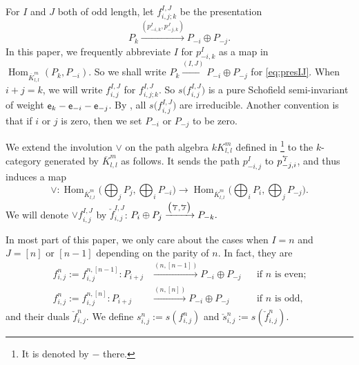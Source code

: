 \documentclass{amsart}
\theoremstyle{definition}
\theoremstyle{remark}
\numberwithin{equation}{section}
\DeclareMathOperator{\Hom}{Hom}
\newcommand{\br}[1]{\overline{#1}}
\newcommand{\e}{{\sf e}}
\newcommand{\kllm}{{K_{l,l}^m}}
\newcommand{\invarr}[1]{{\scriptsize \overleftarrow{#1}}}
\newcommand{\ijn}{_{i,j}^{n}}
\begin{document}
For $I$ and $J$ both of odd length, let $f_{i,j;k}^{I,J}$ be the presentation
\begin{equation} \label{eq:presIJ} P_k \xrightarrow{\left(p_{-i,k}^I,p_{-j,k}^J\right)} P_{-i}\oplus P_{-j}.
\end{equation}
In this paper, we frequently abbreviate $I$ for $p_{-i,k}^I$ as a map in $\Hom_{\br{K}_{l,l}^{m}}(P_{k},P_{-i})$.
So we shall write $P_k \xrightarrow{(I,J)} P_{-i}\oplus P_{-j}$ for \eqref{eq:presIJ}.
When $i+j=k$, we will write $f_{i,j}^{I,J}$ for $f_{i,j;k}^{I,J}$. %
So $s\big(f_{i,j}^{I,J}\big)$ is a pure Schofield semi-invariant of weight $\e_k-\e_{-i}-\e_{-j}$.
By \cite[Lemma 1.8]{Fs1}, all $s\big(f_{i,j}^{I,J}\big)$ are irreducible.
Another convention is that if $i$ or $j$ is zero, then we set $P_{-i}$ or $P_{-j}$ to be zero. 


We extend the involution $\vee$ on the path algebra $k\kllm$ defined in \cite{Fk1} \footnote{It is denoted by $-$ there.} to the $k$-category generated by $\br{K}_{l,l}^{m}$ as follows.
It sends the path $p_{-i,j}^I$ to $p_{-j,i}^{\invarr{I}}$, and thus induces a map
\begin{equation*} \label{eq:-map}
\vee: \Hom_{\br{K}_{l,l}^{m}}\Big(\bigoplus_j P_j, \bigoplus_i P_{-i}\Big) \xrightarrow{} \Hom_{\br{K}_{l,l}^{m}}\Big(\bigoplus_i P_{i}, \bigoplus_j P_{-j}\Big).
\end{equation*}
We will denote $\vee f_{i,j}^{I,J}$ by $\check{f}_{i,j}^{I,J}$:
$P_{i}\oplus P_{j} \xrightarrow{\big(\invarr{I},\invarr{J}\big)} P_{-k}.$



In most part of this paper, we only care about the cases when $I=n$ and $J=[n]\text{ or }[n-1]$ depending on the parity of $n$. %
In fact, they are\begin{align*}	
f\ijn:=f_{i,j}^{n,[n-1]}: P_{i+j}&\xrightarrow{\left(n,[n-1]\right)} P_{-i}\oplus P_{-j} && \text{if $n$ is even;}\\
f\ijn:=f_{i,j}^{n,[n]}: P_{i+j}&\xrightarrow{\left(n,[n]\right)} P_{-i}\oplus P_{-j} && \text{if $n$ is odd,}
\end{align*}
and their duals $\check{f}_{i,j}^{n}$. We define $s\ijn:=s(f\ijn)$ and $\check{s}\ijn:=s(\check{f}\ijn)$.
\end{document}
